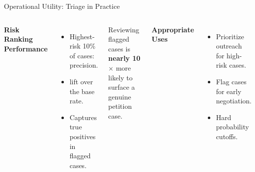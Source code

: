 \documentclass[10pt, aspectratio=169]{beamer}
\begin{document}
\begin{frame}{Operational Utility: Triage in Practice}
    \begin{columns}
        \textbf{Risk Ranking Performance}
        \begin{itemize}
            \item Highest-risk 10\% of cases: \textbf{\metricTopDecilePrecision{}} precision.
            \item \textbf{\metricTopDecileLift{}} lift over the base rate.
            \item Captures \metricTopDecileTP{} true positives in \metricTopDecileN{} flagged cases.
        \end{itemize}
        \vspace{0.8em}
        Reviewing flagged cases is \textbf{nearly 10$\times$} more likely to surface a genuine petition case.

        \textbf{Appropriate Uses}
        \begin{itemize}
            \item[\checkmark] Prioritize outreach for high-risk cases.
            \item[\checkmark] Flag cases for early negotiation.
            \item[$\times$] Hard probability cutoffs.
        \end{itemize}
    \end{columns}
\end{frame}
\end{document}
